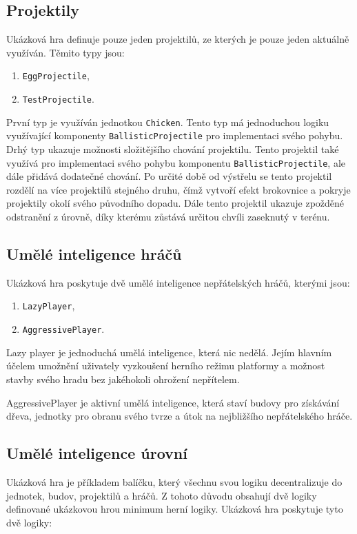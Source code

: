 \subsection{Projektily}
Ukázková hra definuje pouze jeden projektilů, ze kterých je pouze jeden aktuálně využíván. Těmito typy jsou:

\begin{enumerate}
	\item \texttt{EggProjectile},
	\item \texttt{TestProjectile}.
\end{enumerate}

První typ je využíván jednotkou \texttt{Chicken}. Tento typ má jednoduchou logiku využívající komponenty \texttt{BallisticProjectile} pro implementaci svého pohybu. Drhý typ ukazuje možnosti složitějšího chování projektilu. Tento projektil také využívá pro implementaci svého pohybu komponentu \texttt{BallisticProjectile}, ale dále přidává dodatečné chování. Po určité době od výstřelu se tento projektil rozdělí na více projektilů stejného druhu, čímž vytvoří efekt brokovnice a pokryje projektily okolí svého původního dopadu. Dále tento projektil ukazuje zpožděné odstranění z úrovně, díky kterému zůstává určitou chvíli zaseknutý v terénu.

\subsection{Umělé inteligence hráčů}
Ukázková hra poskytuje dvě umělé inteligence nepřátelských hráčů, kterými jsou:

\begin{enumerate}
	\item \texttt{LazyPlayer},
	\item \texttt{AggressivePlayer}.
\end{enumerate}

Lazy player je jednoduchá umělá inteligence, která nic nedělá. Jejím hlavním účelem umožnění uživately vyzkoušení herního režimu platformy a možnost stavby svého hradu bez jakéhokoli ohrožení nepřítelem.

AggressivePlayer je aktivní umělá inteligence, která staví budovy pro získávání dřeva, jednotky pro obranu svého tvrze a útok na nejbližšího nepřátelského hráče.

\subsection{Umělé inteligence úrovní}
Ukázková hra je příkladem balíčku, který všechnu svou logiku decentralizuje do jednotek, budov, projektilů a hráčů. Z tohoto důvodu obsahují dvě logiky definované ukázkovou hrou minimum herní logiky. Ukázková hra poskytuje tyto dvě logiky:

